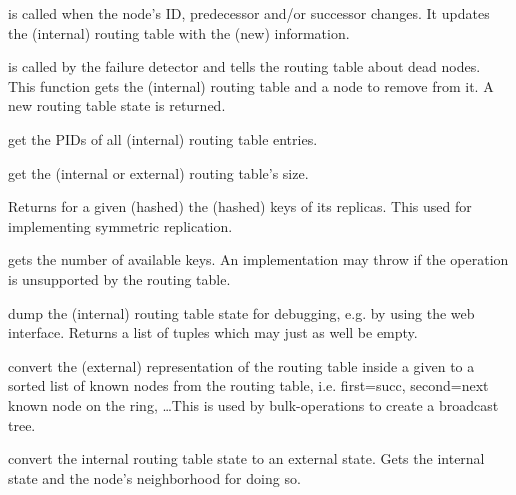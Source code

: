 \begin{description}
\item {} is called when the node's ID, predecessor and/or
  successor changes. It updates the (internal) routing table with the (new)
  information.

\item {} is called by the failure detector and tells
  the routing table about dead nodes. This function gets the (internal) routing
  table and a node to remove from it. A new routing table state is returned.

\item {} get the PIDs of all (internal) routing table
  entries.

\item {} get the (internal or external) routing table's size.

\item {} Returns for a given (hashed)
   the (hashed) keys of its replicas. This used for implementing
  symmetric replication.

\item {} gets the number of available keys. An implementation may
  throw  if the operation is unsupported by
  the routing table.

\item {} dump the (internal) routing table state for debugging,
  e.g. by using the web interface. Returns a list of
   tuples which may just as well be empty.

\item {} convert the (external) representation of the routing
  table inside a given  to a sorted list of known nodes
  from the routing table, i.e. first=succ, second=next known node on the ring,
  \ldots This is used by bulk-operations to create a
  broadcast tree.

\item {} convert the internal routing table state
  to an external state. Gets the internal state and the node's neighborhood
  for doing so.


\end{description}
